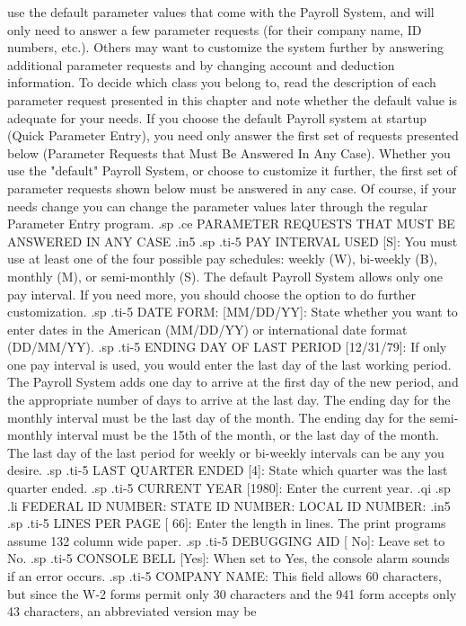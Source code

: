 use the default
parameter values that come with the Payroll System, and will only need
to answer a few parameter requests (for their company name, ID
numbers, etc.). Others may want to
customize the system further by answering additional parameter requests
and by changing account and deduction information.
To decide which class you belong to, read the description of each
parameter request
presented in this chapter and note whether the default value
is adequate for your needs.  If you choose the default Payroll system
at startup (Quick Parameter Entry), you
need only answer the first set of requests presented below
(Parameter Requests that Must Be Answered In Any Case).
Whether you use the "default" Payroll System,
or choose to customize it further, the first set of parameter requests
shown below must be answered in any case.  Of course, if your needs change
you can change the parameter values later through the regular Parameter
Entry program.
.sp
.ce
PARAMETER REQUESTS THAT MUST BE ANSWERED IN ANY CASE
.in5
.sp
.ti-5
PAY INTERVAL USED [S]: You must use at least one of the four possible
pay schedules: weekly (W), bi-weekly (B), monthly (M), or semi-monthly (S).
The default Payroll System allows only one pay interval.  If you need more,
you should choose the option to do further customization.
.sp
.ti-5
DATE FORM: [MM/DD/YY]: State whether you want to enter dates in
the American (MM/DD/YY)
or international date format (DD/MM/YY).
.sp
.ti-5
ENDING DAY OF LAST PERIOD [12/31/79]: If only one pay interval is used,
you would enter the last day of the last working period.  The Payroll
System adds one day to arrive at the first day of the new period, and
the appropriate number of days to arrive at the last day. The ending day
for the monthly interval must be the last day of the month.  The ending
day for the semi-monthly interval must be the 15th of the month, or the
last day of the month.	The last day of the last period for weekly or
bi-weekly intervals can be any you desire.
.sp
.ti-5
LAST QUARTER ENDED [4]: State which quarter was the last quarter ended.
.sp
.ti-5
CURRENT YEAR [1980]: Enter the current year.
.qi
.sp
.li
FEDERAL ID NUMBER:
STATE	ID NUMBER:
LOCAL	ID NUMBER:
.in5
.sp
.ti-5
LINES PER PAGE [ 66]: Enter the length in lines. The print programs
assume 132 column wide paper.
.sp
.ti-5
DEBUGGING AID [ No]: Leave set to No.
.sp
.ti-5
CONSOLE BELL [Yes]: When set to Yes, the console alarm sounds if
an error occurs.
.sp
.ti-5
COMPANY NAME: This field allows 60 characters, but since the W-2 forms
permit only 30 characters and the
941 form accepts only 43 characters, an abbreviated version may be
